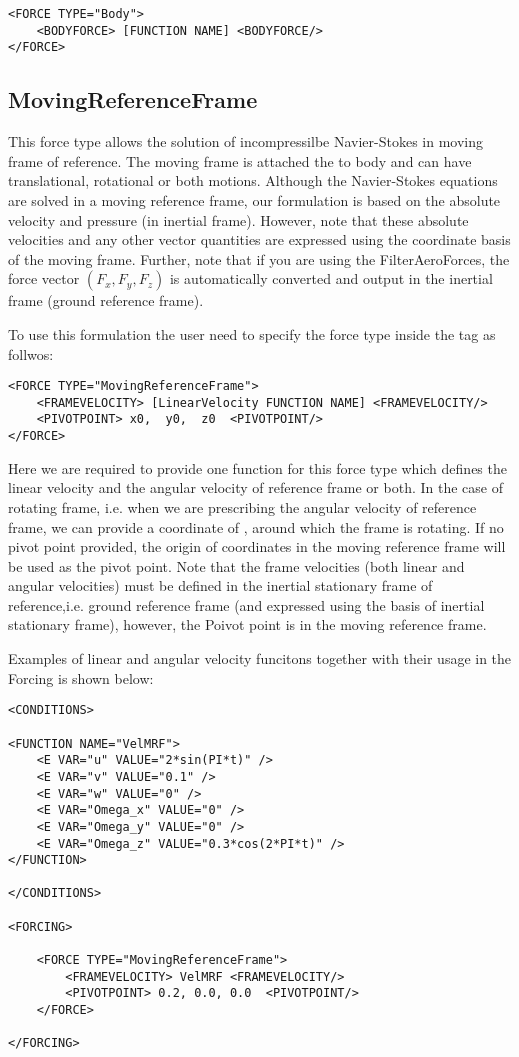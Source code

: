 \begin{lstlisting}[style=XMLStyle] 
<FORCE TYPE="Body">
    <BODYFORCE> [FUNCTION NAME] <BODYFORCE/>
</FORCE>
\end{lstlisting}

\subsection{MovingReferenceFrame}
This force type allows the solution of incompressilbe Navier-Stokes in moving frame of reference. The moving frame is attached the to body and can have translational, rotational or both motions. Although the Navier-Stokes equations are solved in a moving reference frame, our formulation is based on the absolute velocity and pressure (in inertial frame). However, note that these absolute velocities and any other vector quantities are expressed using the coordinate basis of the moving frame. Further, note that if you are using the FilterAeroForces, the force vector $\left(F_x, F_y, F_z\right)$ is automatically converted and output in the inertial frame (ground reference frame).

To use this formulation the user need to specify the force type inside the  tag as follwos:

\begin{lstlisting}[style=XMLStyle]
<FORCE TYPE="MovingReferenceFrame">
    <FRAMEVELOCITY> [LinearVelocity FUNCTION NAME] <FRAMEVELOCITY/>
    <PIVOTPOINT> x0,  y0,  z0  <PIVOTPOINT/>
</FORCE>
\end{lstlisting}

Here we are required to provide one function for this force type which defines the linear velocity and the angular velocity of reference frame or both. In the case of rotating frame, i.e. when we are prescribing the angular velocity of reference frame, we can provide a coordinate of , around which the frame is rotating. If no pivot point provided, the origin of coordinates in the moving reference frame will be used as the pivot point.
Note that the frame velocities (both linear and angular velocities) must be defined in the inertial stationary frame of reference,i.e. ground reference frame (and expressed using the basis of inertial stationary frame), however, the Poivot point is in the moving reference frame.

Examples of linear and angular velocity funcitons together with their usage in the Forcing is shown below:

\begin{lstlisting}[style=XMLStyle]
<CONDITIONS>

<FUNCTION NAME="VelMRF">
    <E VAR="u" VALUE="2*sin(PI*t)" />
    <E VAR="v" VALUE="0.1" />
    <E VAR="w" VALUE="0" />
    <E VAR="Omega_x" VALUE="0" />
    <E VAR="Omega_y" VALUE="0" />
    <E VAR="Omega_z" VALUE="0.3*cos(2*PI*t)" />
</FUNCTION>

</CONDITIONS>

<FORCING>

    <FORCE TYPE="MovingReferenceFrame">
        <FRAMEVELOCITY> VelMRF <FRAMEVELOCITY/>
        <PIVOTPOINT> 0.2, 0.0, 0.0  <PIVOTPOINT/>
    </FORCE>

</FORCING>
\end{lstlisting}


